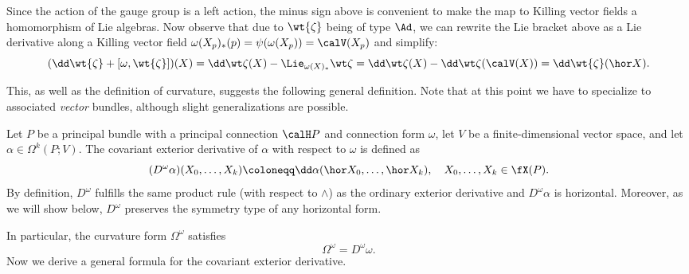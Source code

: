 Since the action of the gauge group is a left action, the minus sign above is convenient to make the map to Killing vector fields a homomorphism of Lie algebras. Now observe that due to $\wt{\zeta}$ being of type $\Ad$, we can rewrite the Lie bracket above as a Lie derivative along a Killing vector field $\omega(X_p)_\ast(p)=\psi(\omega(X_p))=\calV(X_p)$ and simplify:
\[(\dd\wt{\zeta}+[\omega,\wt{\zeta}])(X)=
\dd\wt\zeta(X)-\Lie_{\omega(X)_\ast}\wt\zeta=
\dd\wt\zeta(X)-\dd\wt\zeta(\calV(X))=\dd\wt{\zeta}(\hor X).\label{eq 4791793}\]

This, as well as the definition of curvature, suggests the following general definition. Note that at this point we have to specialize to associated \emph{vector} bundles, although slight generalizations are possible.

\begin{defn}
    Let $P$ be a principal bundle with a principal connection $\calH P$ and connection form $\omega$, let $V$ be a finite-dimensional vector space, and let $\alpha\in\Omega^k(P;V)$. The covariant exterior derivative of $\alpha$ with respect to $\omega$ is defined as
    \[(D^\omega \alpha)(X_0,\ldots,X_k)\coloneqq \dd\alpha(\hor X_0,\ldots,\hor X_k),\quad X_0,\ldots,X_k\in\fX(P).\]
    By definition, $D^\omega$ fulfills the same product rule (with respect to $\wedge$) as the ordinary exterior derivative and $D^\omega \alpha$ is horizontal. Moreover, as we will show below, $D^\omega$ preserves the symmetry type of any horizontal form.
\end{defn}

In particular, the curvature form $\Omega^\omega$ satisfies 
\[\Omega^\omega=D^\omega\omega.\]
Now we derive a general formula for the covariant exterior derivative.

